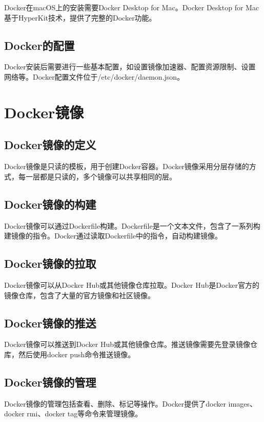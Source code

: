 \documentclass[12pt,UTF8]{ctexbook}
\begin{document}
Docker在macOS上的安装需要Docker Desktop for Mac。Docker Desktop for Mac基于HyperKit技术，提供了完整的Docker功能。

\section{Docker的配置}

Docker安装后需要进行一些基本配置，如设置镜像加速器、配置资源限制、设置网络等。Docker配置文件位于/etc/docker/daemon.json。

\chapter{Docker镜像}

\section{Docker镜像的定义}

Docker镜像是只读的模板，用于创建Docker容器。Docker镜像采用分层存储的方式，每一层都是只读的，多个镜像可以共享相同的层。

\section{Docker镜像的构建}

Docker镜像可以通过Dockerfile构建。Dockerfile是一个文本文件，包含了一系列构建镜像的指令。Docker通过读取Dockerfile中的指令，自动构建镜像。

\section{Docker镜像的拉取}

Docker镜像可以从Docker Hub或其他镜像仓库拉取。Docker Hub是Docker官方的镜像仓库，包含了大量的官方镜像和社区镜像。

\section{Docker镜像的推送}

Docker镜像可以推送到Docker Hub或其他镜像仓库。推送镜像需要先登录镜像仓库，然后使用docker push命令推送镜像。

\section{Docker镜像的管理}

Docker镜像的管理包括查看、删除、标记等操作。Docker提供了docker images、docker rmi、docker tag等命令来管理镜像。
\end{document}

